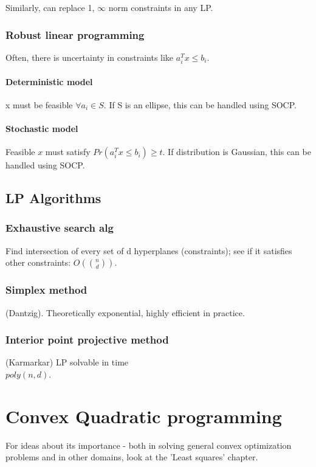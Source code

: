 \documentclass[oneside, article]{memoir}
\begin{document}
Similarly, can replace 1, $\infty$ norm constraints in any LP.

\section{Robust linear programming}
Often, there is uncertainty in constraints like $a_i^{T}x \leq b_i$.

\subsection{Deterministic model}
x must be feasible $\forall a_i \in S$. If S is an ellipse, this can be handled using SOCP.

\subsection{Stochastic model}
Feasible $x$ must satisfy $Pr(a_i^{T}x \leq b_i) \geq t$. If distribution is Gaussian, this can be handled using SOCP.

\chapter{LP Algorithms}
\section{Exhaustive search alg}
Find intersection of every set of d hyperplanes (constraints); see if it satisfies other constraints: $O(\binom{n}{d})$.

\section{Simplex method}
(Dantzig). Theoretically exponential, highly efficient in practice.

\section{Interior point projective method}
(Karmarkar) LP solvable in time \\
$poly(n, d)$.

\part{Convex Quadratic programming}
For ideas about its importance - both in solving general convex optimization problems and in other domains, look at the 'Least squares' chapter.
\end{document}
